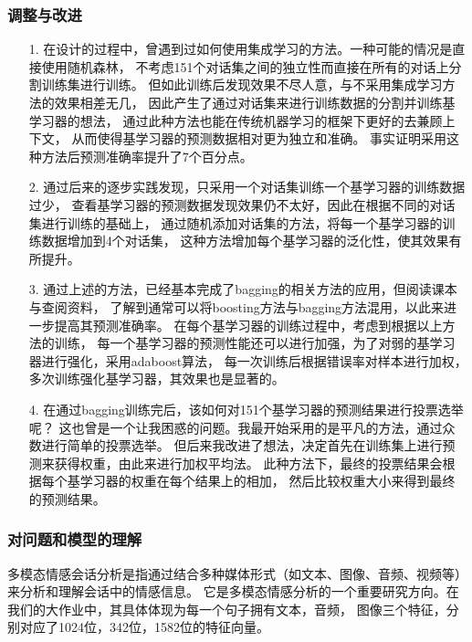 \documentclass[11pt]{article}
\begin{document}
            \subsubsection{调整与改进}
            \begin{enumerate}
                \item [1.]在设计的过程中，曾遇到过如何使用集成学习的方法。一种可能的情况是直接使用随机森林，
                        不考虑151个对话集之间的独立性而直接在所有的对话上分割训练集进行训练。
                        但如此训练后发现效果不尽人意，与不采用集成学习方法的效果相差无几，
                        因此产生了通过对话集来进行训练数据的分割并训练基学习器的想法，
                        通过此种方法也能在传统机器学习的框架下更好的去兼顾上下文，
                        从而使得基学习器的预测数据相对更为独立和准确。
                        事实证明采用这种方法后预测准确率提升了7个百分点。
                \item [2.]通过后来的逐步实践发现，只采用一个对话集训练一个基学习器的训练数据过少，
                        查看基学习器的预测数据发现效果仍不太好，因此在根据不同的对话集进行训练的基础上，
                        通过随机添加对话集的方法，将每一个基学习器的训练数据增加到4个对话集，
                        这种方法增加每个基学习器的泛化性，使其效果有所提升。
                \item [3.]通过上述的方法，已经基本完成了bagging的相关方法的应用，但阅读课本与查阅资料，
                        了解到通常可以将boosting方法与bagging方法混用，以此来进一步提高其预测准确率。
                        在每个基学习器的训练过程中，考虑到根据以上方法的训练，
                        每一个基学习器的预测性能还可以进行加强，为了对弱的基学习器进行强化，采用adaboost算法，
                        每一次训练后根据错误率对样本进行加权，多次训练强化基学习器，其效果也是显著的。
                \item [4.]在通过bagging训练完后，该如何对151个基学习器的预测结果进行投票选举呢？
                        这也曾是一个让我困惑的问题。我最开始采用的是平凡的方法，通过众数进行简单的投票选举。
                        但后来我改进了想法，决定首先在训练集上进行预测来获得权重，由此来进行加权平均法。
                        此种方法下，最终的投票结果会根据每个基学习器的权重在每个结果上的相加，
                        然后比较权重大小来得到最终的预测结果。
            \end{enumerate}

            \subsubsection{对问题和模型的理解}
            多模态情感会话分析是指通过结合多种媒体形式（如文本、图像、音频、视频等）来分析和理解会话中的情感信息。
            它是多模态情感分析的一个重要研究方向。在我们的大作业中，其具体体现为每一个句子拥有文本，音频，
            图像三个特征，分别对应了1024位，342位，1582位的特征向量。
\end{document}
